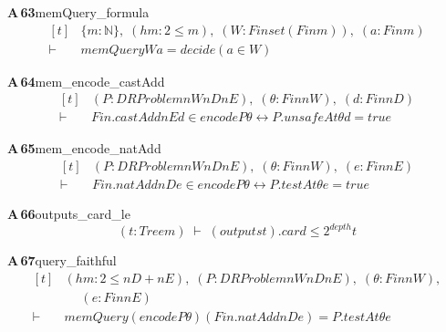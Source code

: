 \documentclass[conference]{IEEEtran}
\theoremstyle{definition}
\newcommand{\lean}[1]{\textsf{\footnotesize #1}}
\begin{document}
\noindent\textbf{A\,63}\quad\lean{memQuery\_formula}
{\footnotesize\[ \begin{aligned}[t]
&\{ \mathit{m} : \mathbb{N} \},\; (\mathit{hm} : 2 \leq \mathit{m}),\; (\mathit{W} : \mathit{Finset} (\mathit{Fin} \mathit{m})),\; (\mathit{a} : \mathit{Fin} \mathit{m})\\
\vdash\;&\mathit{memQuery} \mathit{W} \mathit{a} = \mathit{decide} (\mathit{a} \in \mathit{W})
\end{aligned} \]}

\noindent\textbf{A\,64}\quad\lean{mem\_encode\_castAdd}
{\footnotesize\[ \begin{aligned}[t]
&(\mathit{P} : \mathit{DRProblem} \mathit{nW} \mathit{nD} \mathit{nE}),\; (\theta : \mathit{Fin} \mathit{nW}),\; (\mathit{d} : \mathit{Fin} \mathit{nD})\\
\vdash\;&\mathit{Fin}.\mathit{castAdd} \mathit{nE} \mathit{d} \in \mathit{encode} \mathit{P} \theta \leftrightarrow \mathit{P}.\mathit{unsafeAt} \theta \mathit{d} = \mathit{true}
\end{aligned} \]}

\noindent\textbf{A\,65}\quad\lean{mem\_encode\_natAdd}
{\footnotesize\[ \begin{aligned}[t]
&(\mathit{P} : \mathit{DRProblem} \mathit{nW} \mathit{nD} \mathit{nE}),\; (\theta : \mathit{Fin} \mathit{nW}),\; (\mathit{e} : \mathit{Fin} \mathit{nE})\\
\vdash\;&\mathit{Fin}.\mathit{natAdd} \mathit{nD} \mathit{e} \in \mathit{encode} \mathit{P} \theta \leftrightarrow \mathit{P}.\mathit{testAt} \theta \mathit{e} = \mathit{true}
\end{aligned} \]}

\noindent\textbf{A\,66}\quad\lean{outputs\_card\_le}
{\footnotesize\[ (\mathit{t} : \mathit{Tree} \mathit{m}) \;\vdash\; (\mathit{outputs} \mathit{t}).\mathit{card} \leq 2 ^{\mathit{depth}} \mathit{t} \]}

\noindent\textbf{A\,67}\quad\lean{query\_faithful}
{\footnotesize\[ \begin{aligned}[t]
&(\mathit{hm} : 2 \leq \mathit{nD} + \mathit{nE}),\; (\mathit{P} : \mathit{DRProblem} \mathit{nW} \mathit{nD} \mathit{nE}),\; (\theta : \mathit{Fin} \mathit{nW}),\\
&\quad \; (\mathit{e} : \mathit{Fin} \mathit{nE})\\
\vdash\;&\mathit{memQuery} (\mathit{encode} \mathit{P} \theta ) (\mathit{Fin}.\mathit{natAdd} \mathit{nD} \mathit{e}) = \mathit{P}.\mathit{testAt} \theta \mathit{e}
\end{aligned} \]}
\end{document}
